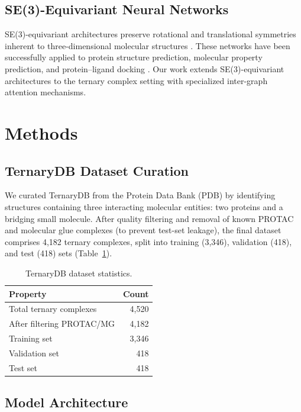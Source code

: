 \documentclass[11pt]{article}
\begin{document}
\subsection{SE(3)-Equivariant Neural Networks}
SE(3)-equivariant architectures preserve rotational and translational symmetries inherent to three-dimensional molecular structures \citep{thomas2018,fuchs2020}. These networks have been successfully applied to protein structure prediction, molecular property prediction, and protein--ligand docking \citep{ganea2022}. Our work extends SE(3)-equivariant architectures to the ternary complex setting with specialized inter-graph attention mechanisms.

\section{Methods}

\subsection{TernaryDB Dataset Curation}

We curated TernaryDB from the Protein Data Bank (PDB) by identifying structures containing three interacting molecular entities: two proteins and a bridging small molecule. After quality filtering and removal of known PROTAC and molecular glue complexes (to prevent test-set leakage), the final dataset comprises 4,182 ternary complexes, split into training (3,346), validation (418), and test (418) sets (Table~\ref{tab:dataset}).

\begin{table}[h]
\centering
\caption{TernaryDB dataset statistics.}
\label{tab:dataset}
\begin{tabular}{lr}
\toprule
Property & Count \\
\midrule
Total ternary complexes & 4,520 \\
After filtering PROTAC/MG & 4,182 \\
Training set & 3,346 \\
Validation set & 418 \\
Test set & 418 \\
\bottomrule
\end{tabular}
\end{table}

\subsection{Model Architecture}
\end{document}
